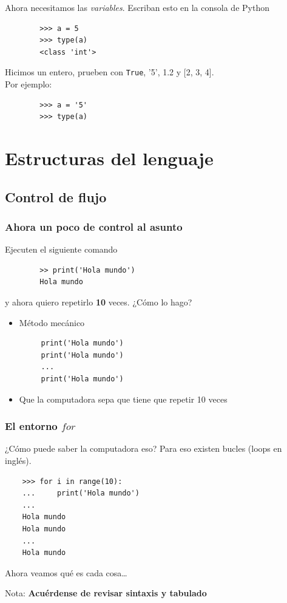\documentclass{beamer}
\begin{document}
\begin{frame}[fragile]
    Ahora necesitamos las \emph{variables}. Escriban esto en la consola de Python
    \begin{verbatim}
        >>> a = 5
        >>> type(a)
        <class 'int'>
    \end{verbatim}
    Hicimos un entero, prueben con \texttt{True}, '5', 1.2 y [2, 3, 4]. \\Por ejemplo:
    \begin{verbatim}
        >>> a = '5'
        >>> type(a)
    \end{verbatim}
\end{frame}


\section{Estructuras del lenguaje}
\subsection{Control de flujo}
\begin{frame}[fragile]
    \frametitle{Ahora un poco de control al asunto}
    Ejecuten el siguiente comando
    \begin{verbatim}
        >> print('Hola mundo')
        Hola mundo
    \end{verbatim}
    y ahora quiero repetirlo \textbf{10} veces. ¿Cómo lo hago?
    \begin{itemize}
    \item<+> Método mecánico \begin{verbatim}
     print('Hola mundo')
     print('Hola mundo')
     ...
     print('Hola mundo')
    \end{verbatim}
    \item<+> Que la computadora sepa que tiene que repetir 10 veces
    \end{itemize}
\end{frame}

\begin{frame}[fragile]
    \frametitle{El entorno $for$}
    ¿Cómo puede saber la computadora eso? Para eso existen bucles (loops en inglés). 
    \begin{verbatim}
    >>> for i in range(10):
    ...     print('Hola mundo')
    ...
    Hola mundo
    Hola mundo
    ...
    Hola mundo
    \end{verbatim}
    Ahora veamos qué es cada cosa\ldots
    
    \vspace{5mm}
    \tiny{Nota: \textbf{Acuérdense de revisar sintaxis y tabulado}}
\end{frame}
    
\end{document}
